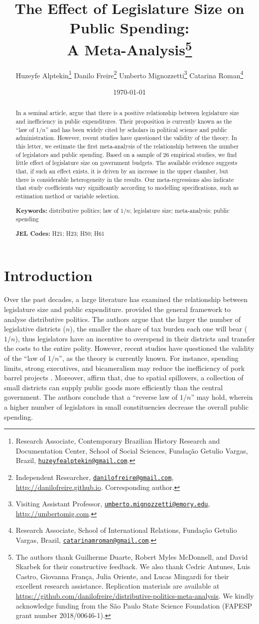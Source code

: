\documentclass[a4paper,12pt]{article}
\title{The Effect of Legislature Size on Public Spending:\\ A Meta-Analysis\thanks{The authors thank Guilherme Duarte, Robert Myles McDonnell, and David Skarbek for their constructive feedback. We also thank Cedric Antunes, Luis Castro, Giovanna França, Julia Oriente, and Lucas Mingardi for their excellent research assistance. Replication materials are available at \url{https://github.com/danilofreire/distributive-politics-meta-analysis}. We kindly acknowledge funding from the São Paulo State Science Foundation (FAPESP grant number 2018/00646-1).}}
\author{Huzeyfe Alptekin\thanks{Research Associate, Contemporary Brazilian History Research and Documentation Center, School of Social Sciences, Fundação Getulio Vargas, Brazil, \href{mailto:huzeyfealptekin@gmail.com}{\texttt{huzeyfealptekin@gmail.com}}.}
\hspace{.5cm} Danilo Freire\thanks{Independent Researcher, \href{mailto:danilofreire@gmail.com}{\texttt{danilofreire@gmail.com}}, \url{http://danilofreire.github.io}. Corresponding author.} 
\hspace{.5cm} Umberto Mignozzetti\thanks{Visiting Assistant Professor, \href{mailto:umberto.mignozzetti@emory.edu}{\texttt{umberto.mignozzetti@emory.edu}}, \url{http://umbertomig.com}.} 
\hspace{.5cm} Catarina Roman\thanks{Research Associate, School of International Relations, Fundação Getulio Vargas, Brazil, \href{mailto:catarinamroman@gmail.com}{\texttt{catarinamroman@gmail.com}}.}}
\date{\today}
\begin{document}
\maketitle

\begin{abstract}
\noindent In a seminal article, \citet{weingast1981political} argue that there
is a positive relationship between legislature size and inefficiency in public
expenditures. Their proposition is currently known as the ``law of $1/n$'' and
has been widely cited by scholars in political science and public
administration. However, recent studies have questioned the validity of the
theory. In this letter, we estimate the first meta-analysis of the relationship
between the number of legislators and public spending. Based on a sample of 26
empirical studies, we find little effect of legislature size on government
budgets. The available evidence suggests that, if such an effect exists, it is
driven by an increase in the upper chamber, but there is considerable
heterogeneity in the results. Our meta-regressions also indicate that study
coefficients vary significantly according to modelling specifications, such as
estimation method or variable selection. 

\vspace{.4cm}
\noindent \textbf{Keywords:} distributive politics; law of $1/n$; legislature
size; meta-analysis; public spending

\noindent \textbf{JEL Codes:} H21; H23; H50; H61
\end{abstract}

\newpage

\section{Introduction}
\label{sec:intro}

Over the past decades, a large literature has examined the relationship between
legislature size and public expenditure. \citet{weingast1981political} provided
the general framework to analyse distributive politics. The authors argue that
the larger the number of legislative districts ($n$), the smaller the share of
tax burden each one will bear ($1/n$), thus legislators have an incentive to
overspend in their districts and transfer the costs to the entire polity.
However, recent studies have questioned the validity of the ``law of $1/n$'', as
the theory is currently known. For instance, spending limits, strong executives,
and bicameralism may reduce the inefficiency of pork barrel projects
\citep{bradbury2009spatially,chen_malhotra_2007,primo2006stop}. Moreover,
\citet{primo2008distributive} affirm that, due to spatial spillovers, a
collection of small districts can supply public goods more efficiently than the
central government. The authors conclude that a ``reverse law of $1/n$'' may
hold, wherein a higher number of legislators in small constituencies decrease
the overall public spending.
\end{document}
